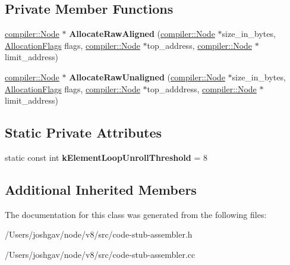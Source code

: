 \subsection*{Private Member Functions}
\begin{DoxyCompactItemize}
\item 
\hyperlink{classv8_1_1internal_1_1compiler_1_1_node}{compiler\+::\+Node} $\ast$ {\bfseries Allocate\+Raw\+Aligned} (\hyperlink{classv8_1_1internal_1_1compiler_1_1_node}{compiler\+::\+Node} $\ast$size\+\_\+in\+\_\+bytes, \hyperlink{classv8_1_1base_1_1_flags}{Allocation\+Flags} flags, \hyperlink{classv8_1_1internal_1_1compiler_1_1_node}{compiler\+::\+Node} $\ast$top\+\_\+address, \hyperlink{classv8_1_1internal_1_1compiler_1_1_node}{compiler\+::\+Node} $\ast$limit\+\_\+address)\hypertarget{classv8_1_1internal_1_1_code_stub_assembler_aeffb8c662aa27387569a7c14cfd72d5c}{}\label{classv8_1_1internal_1_1_code_stub_assembler_aeffb8c662aa27387569a7c14cfd72d5c}

\item 
\hyperlink{classv8_1_1internal_1_1compiler_1_1_node}{compiler\+::\+Node} $\ast$ {\bfseries Allocate\+Raw\+Unaligned} (\hyperlink{classv8_1_1internal_1_1compiler_1_1_node}{compiler\+::\+Node} $\ast$size\+\_\+in\+\_\+bytes, \hyperlink{classv8_1_1base_1_1_flags}{Allocation\+Flags} flags, \hyperlink{classv8_1_1internal_1_1compiler_1_1_node}{compiler\+::\+Node} $\ast$top\+\_\+adddress, \hyperlink{classv8_1_1internal_1_1compiler_1_1_node}{compiler\+::\+Node} $\ast$limit\+\_\+address)\hypertarget{classv8_1_1internal_1_1_code_stub_assembler_a63266d2788867fcd34f12db1b57a6d98}{}\label{classv8_1_1internal_1_1_code_stub_assembler_a63266d2788867fcd34f12db1b57a6d98}

\end{DoxyCompactItemize}
\subsection*{Static Private Attributes}
\begin{DoxyCompactItemize}
\item 
static const int {\bfseries k\+Element\+Loop\+Unroll\+Threshold} = 8\hypertarget{classv8_1_1internal_1_1_code_stub_assembler_af9fe041c87e607286adfe11d28214d93}{}\label{classv8_1_1internal_1_1_code_stub_assembler_af9fe041c87e607286adfe11d28214d93}

\end{DoxyCompactItemize}
\subsection*{Additional Inherited Members}


The documentation for this class was generated from the following files\+:\begin{DoxyCompactItemize}
\item 
/\+Users/joshgav/node/v8/src/code-\/stub-\/assembler.\+h\item 
/\+Users/joshgav/node/v8/src/code-\/stub-\/assembler.\+cc\end{DoxyCompactItemize}
